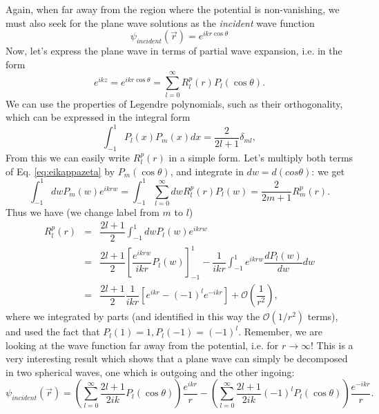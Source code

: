 Again, when far away from the region where the potential is non-vanishing, we must  also seek for the plane wave solutions as the {\it incident} wave function
\[ \psi_{incident}(\vec{r}) = e^{i kr \cos \theta}  \]
Now, let's express the plane wave in terms of partial wave expansion, i.e. in the form
\begin{equation}\label{eq:eikappazeta}
  e^{ikz} = e^{ikr \cos \theta} = \sum_{l=0}^{\infty} R^p_l(r) P_l (\cos \theta).
\end{equation}
We can use the properties of Legendre polynomials, such as their orthogonality, which can be expressed in the integral form
\[\int_{-1}^{1} P_l(x)P_m(x) dx = \dfrac{2}{2l+1} \delta_{ml},\]
From this we can easily write $R^p_l(r)$ in a simple form. Let's multiply both terms of Eq. \eqref{eq:eikappazeta} by $P_m(\cos\theta)$, and integrate in $dw=d(cos\theta)$: we get
\[
\int_{-1}^1 dw P_m(w) e^{ikrw} =\int_{-1}^1\sum_{l=0}^\infty dw R_l^p(r)P_l(w) = \frac{2}{2m+1} R_m^p(r).
\]
Thus we have (we change label from $m$ to $l$)
\begin{eqnarray}
R^p_l(r) & = & \dfrac{2l+1}{2} \int_{-1}^1 dw P_l(w)e^{ikrw} \nonumber \\
& = & \dfrac{2l+1}{2} \left [ \dfrac{e^{ikr w} }{ikr}  P_l(w)  \right ]_{-1}^{1} - \dfrac{1}{ikr} \int_{-1}^{1} e^{ikr w} \dfrac{dP_l(w)}{dw}dw \nonumber  \\ 
&= & \dfrac{2l+1}{2} \dfrac{1}{ikr}  \left [  e^{ikr}-(-1)^l  e^{-ikr} \right ] + \mathcal{O}\left (\dfrac{1}{r^2} \right ),
 \end{eqnarray}
where we integrated by parts (and identified in this way the $\mathcal{O}(1/r^2)$ terms), and used the fact that $P_l(1)=1, P_l(-1)=(-1)^l$. Remember, we are looking at the wave function far away from the potential, i.e. for $r\to\infty$!
This is a very interesting result which shows that a plane wave can simply be decomposed in two spherical waves, one which is outgoing and the other ingoing:
\[ \boxed{ \psi_{incident}(\vec{r}) = \left ( \sum_{l=0}^{\infty}  \dfrac{2l+1}{2ik} P_l (\cos \theta) \right ) \dfrac{e^{ikr}}{r} - \left ( \sum_{l=0}^{\infty}  \dfrac{2l+1}{2ik} (-1)^l P_l (\cos \theta) \right ) \dfrac{e^{-ikr}}{r} .}\] 

